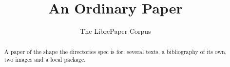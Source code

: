 \documentclass[11pt]{article}
\title{An Ordinary Paper}
\author{The LibrePaper Corpus}
\date{}
\begin{document}
\maketitle

\begin{abstract}
  A paper of the shape the directories spec is for: several texts, a
  bibliography of its own, two images and a local package.
\end{abstract}






\end{document}
